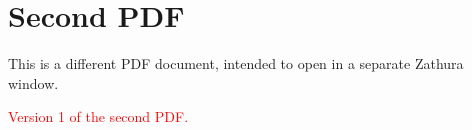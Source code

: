 \documentclass{article}
\begin{document}
\section*{Second PDF}
This is a different PDF document, intended to open in a separate Zathura window.

\textcolor{red}{Version 1 of the second PDF.}
\end{document}
